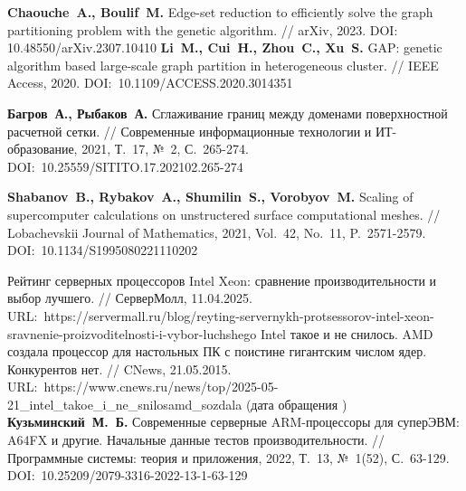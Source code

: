 \begin{thebibliography}{99}
\textbf{Chaouche~A., Boulif~M.} Edge-set reduction to efficiently solve the graph partitioning problem with the genetic algorithm. // arXiv, 2023. DOI: 10.48550/arXiv.2307.10410
\textbf{Li~M., Cui~H., Zhou~C., Xu~S.} GAP: genetic algorithm based large-scale graph partition in heterogeneous cluster. // IEEE Access, 2020. DOI:~10.1109/ACCESS.2020.3014351

\textbf{Багров~А., Рыбаков~А.} Сглаживание границ между доменами поверхностной расчетной сетки. // Современные информационные технологии и ИТ-образование, 2021, Т.~17, №~2, С.~265-274. DOI:~10.25559/SITITO.17.202102.265-274

\textbf{Shabanov~B., Rybakov~A., Shumilin~S., Vorobyov~M.} Scaling of supercomputer calculations on unstructered surface computational meshes. // Lobachevskii Journal of Mathematics, 2021, Vol.~42, No.~11, P.~2571-2579. DOI:~10.1134/S1995080221110202

Рейтинг серверных процессоров Intel Xeon: сравнение производительности и выбор лучшего. // СерверМолл, 11.04.2025. URL:~https://servermall.ru/blog/reyting-servernykh-protsessorov-intel-xeon-sravnenie-proizvoditelnosti-i-vybor-luchshego
Intel такое и не снилось. AMD создала процессор для настольных ПК с поистине гигантским числом ядер. Конкурентов нет. // CNews, 21.05.2015. URL:~https://www.cnews.ru/news/top/2025-05-21\_intel\_takoe\_i\_ne\_snilosamd\_sozdala (дата обращения \StrDate)
\textbf{Кузьминский~М.~Б.} Современные серверные ARM-процессоры для суперЭВМ: A64FX и другие. Начальные данные тестов производительности. // Программные системы: теория и приложения, 2022, Т.~13, №~1(52), С.~63-129. DOI:~10.25209/2079-3316-2022-13-1-63-129


\end{thebibliography}
